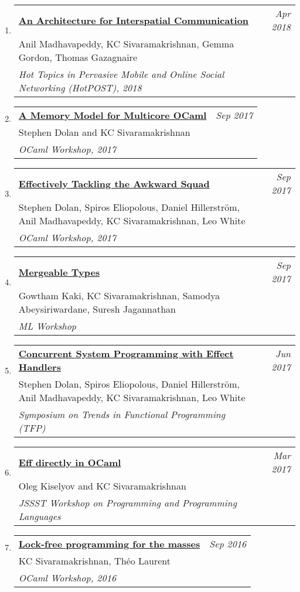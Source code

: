\documentclass[10pt]{article}
\makeatletter
\newcommand{\lbar}[1]{{\color{#1}\ding{118}}\hspace*{2pt}}
\newenvironment{benumerate}[2]{
    \let\oldItem\item
    \def\item{\addtocounter{enumi}{-2}\oldItem}
    \begin{enumerate}[#2] \itemsep3pt
    \setcounter{enumi}{#1}
    \addtocounter{enumi}{1}}
  {\end{enumerate}}
\newenvironment{publication}[5]
{ \item
  \begin{tabular*}{7.5in}{p{6.3in}@{\extracolsep{\fill}}r}
    \href{#1}{\textbf{#2}} & \textit{#3}\\ #4 &\\ \textit{#5}&\\
  \end{tabular*}
} {}
\newenvironment{region}[3]{%
  \vspace*{0.5ex}
  {\scalebox{1.4}{\textbf{#1}}}
  \begin{benumerate}{#3}{\color{RoyalBlue}#2}}
  {\end{benumerate}\vspace{0.8ex}}
\makeatother
\begin{document}
\begin{region} {\lbar{purple}Workshop Publications}{{W}1}{21}
	\begin{publication}{http://kcsrk.info/papers/osmose_feb_18.pdf}
		{An Architecture for Interspatial Communication}
		{Apr 2018}{Anil Madhavapeddy, KC Sivaramakrishnan, Gemma Gordon, Thomas Gazagnaire}
    {Hot Topics in Pervasive Mobile and Online Social Networking (HotPOST), 2018}
  \end{publication}

  \begin{publication}{http://kcsrk.info/papers/memory_model_ocaml17.pdf}
    {A Memory Model for Multicore OCaml}
    {Sep 2017}{Stephen Dolan and KC Sivaramakrishnan}
    {OCaml Workshop, 2017}
  \end{publication}

  \begin{publication}{http://kcsrk.info/papers/awkward_effects_ml17.pdf}
    {Effectively Tackling the Awkward Squad}
    {Sep 2017}{Stephen Dolan, Spiros Eliopolous, Daniel Hillerström, Anil Madhavapeddy, KC Sivaramakrishnan, Leo White}
    {OCaml Workshop, 2017}
  \end{publication}

  \begin{publication}{http://kcsrk.info/papers/mergeable_types_ml17.pdf}
    {Mergeable Types}
    {Sep 2017}{Gowtham Kaki, KC Sivaramakrishnan, Samodya Abeysiriwardane, Suresh Jagannathan}
    {ML Workshop}
  \end{publication}

  \begin{publication}{http://kcsrk.info/papers/system_effects_feb_18.pdf}
    {Concurrent System Programming with Effect Handlers}
    {Jun 2017}{Stephen Dolan, Spiros Eliopolous, Daniel Hillerström, Anil Madhavapeddy, KC Sivaramakrishnan, Leo White}
    {Symposium on Trends in Functional Programming (TFP)}
  \end{publication}

  \begin{publication}{http://kcsrk.info/papers/eff_ocaml_ppl17.pdf}
    {Eff directly in OCaml}
    {Mar 2017}{Oleg Kiselyov and KC Sivaramakrishnan}
    {JSSST Workshop on Programming and Programming Languages}
  \end{publication}

  \begin{publication}{http://kcsrk.info/papers/reagents_ocaml16.pdf}
    {Lock-free programming for the masses}
    {Sep 2016}{KC Sivaramakrishnan, Théo Laurent}
    {OCaml Workshop, 2016}
  \end{publication}


\end{region}
\end{document}
